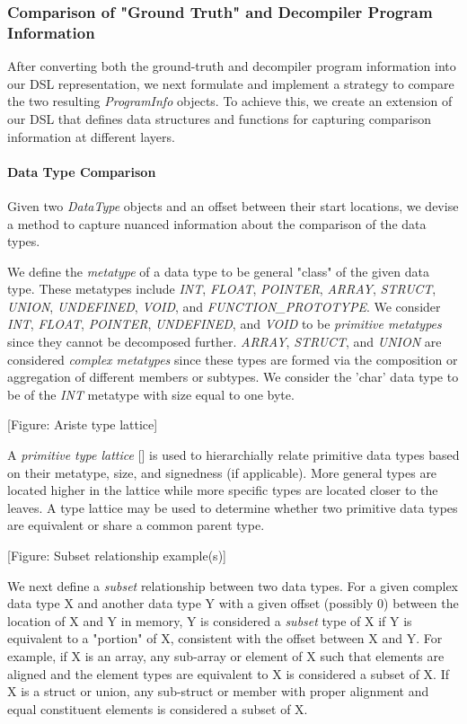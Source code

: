 \documentclass[conference]{IEEEtran}
\begin{document}
\subsubsection{Comparison of "Ground Truth" and Decompiler Program Information}

After converting both the ground-truth and decompiler program information into our DSL representation, we next formulate and implement a strategy to compare the two resulting \emph{ProgramInfo} objects. To achieve this, we create an extension of our DSL that defines data structures and functions for capturing comparison information at different layers.

\paragraph{Data Type Comparison}

Given two \emph{DataType} objects and an offset between their start locations, we devise a method to capture nuanced information about the comparison of the data types.


We define the \emph{metatype} of a data type to be general "class" of the given data type. These metatypes include \emph{INT}, \emph{FLOAT}, \emph{POINTER}, \emph{ARRAY}, \emph{STRUCT}, \emph{UNION}, \emph{UNDEFINED}, \emph{VOID}, and \emph{FUNCTION\_PROTOTYPE}. We consider \emph{INT}, \emph{FLOAT}, \emph{POINTER}, \emph{UNDEFINED}, and \emph{VOID} to be \emph{primitive metatypes} since they cannot be decomposed further. \emph{ARRAY}, \emph{STRUCT}, and \emph{UNION} are considered \emph{complex metatypes} since these types are formed via the composition or aggregation of different members or subtypes. We consider the 'char' data type to be of the \emph{INT} metatype with size equal to one byte.

[Figure: Ariste type lattice]

A \emph{primitive type lattice} [] is used to hierarchially relate primitive data types based on their metatype, size, and signedness (if applicable). More general types are located higher in the lattice while more specific types are located closer to the leaves. A type lattice may be used to determine whether two primitive data types are equivalent or share a common parent type.

[Figure: Subset relationship example(s)]

We next define a \emph{subset} relationship between two data types. For a given complex data type X and another data type Y with a given offset (possibly 0) between the location of X and Y in memory, Y is considered a \emph{subset} type of X if Y is equivalent to a "portion" of X, consistent with the offset between X and Y. For example, if X is an array, any sub-array or element of X such that elements are aligned and the element types are equivalent to X is considered a subset of X. If X is a struct or union, any sub-struct or member with proper alignment and equal constituent elements is considered a subset of X.
\end{document}
